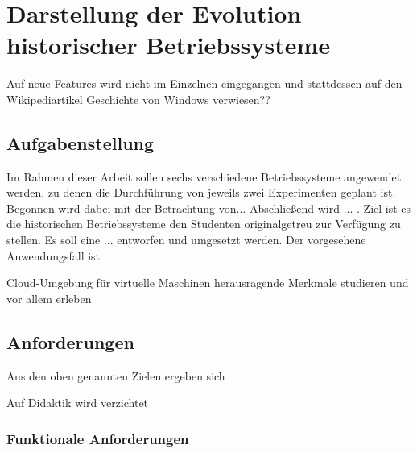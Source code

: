 \chapter{Darstellung der Evolution historischer Betriebssysteme}
\label{chap:challenges}


Auf neue Features wird nicht im Einzelnen eingegangen und stattdessen auf den Wikipediartikel Geschichte von Windows verwiesen??


\section{Aufgabenstellung}
\label{sec:aims}




		Im Rahmen dieser Arbeit sollen sechs verschiedene Betriebssysteme angewendet werden, zu denen die Durchführung von jeweils zwei Experimenten geplant ist. Begonnen wird dabei mit der Betrachtung von... Abschließend wird ... . Ziel ist es die historischen Betriebssysteme den Studenten originalgetreu zur Verfügung zu stellen. 
		Es soll eine ... entworfen und umgesetzt werden.
		Der vorgesehene Anwendungsfall ist


		Cloud-Umgebung für virtuelle Maschinen
		herausragende Merkmale studieren und vor allem erleben



\section{Anforderungen}
\label{sec:requirements}

		Aus den oben genannten Zielen ergeben sich

		Auf Didaktik wird verzichtet
				
		\subsection{Funktionale Anforderungen}

